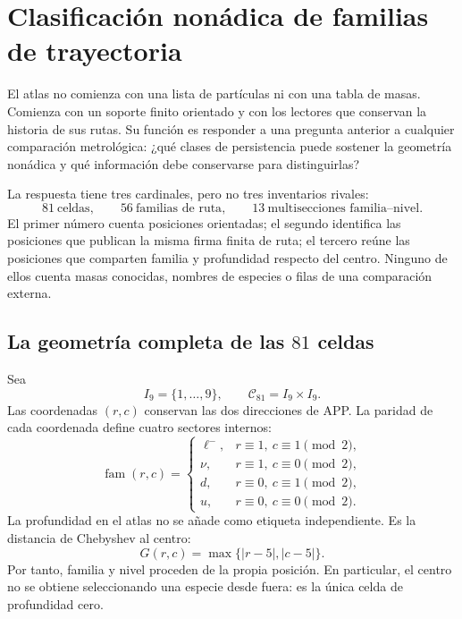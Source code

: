 \chapter[Clasificación nonádica de familias]{Clasificación nonádica de familias de trayectoria}
\label{chap:atlas-genealogia-masas}

El atlas no comienza con una lista de partículas ni con una tabla de masas.
Comienza con un soporte finito orientado y con los lectores que conservan la
historia de sus rutas.  Su función es responder a una pregunta anterior a
cualquier comparación metrológica: ¿qué clases de persistencia puede sostener
la geometría nonádica y qué información debe conservarse para distinguirlas?

La respuesta tiene tres cardinales, pero no tres inventarios rivales:
\[
 81\ \text{celdas},\qquad
 56\ \text{familias de ruta},\qquad
 13\ \text{multisecciones familia--nivel}.
\]
El primer número cuenta posiciones orientadas; el segundo identifica las
posiciones que publican la misma firma finita de ruta; el tercero reúne las
posiciones que comparten familia y profundidad respecto del centro.  Ninguno
de ellos cuenta masas conocidas, nombres de especies o filas de una
comparación externa.

\section{La geometría completa de las \(81\) celdas}

Sea
\[
 I_9=\{1,\ldots,9\},
 \qquad
 \mathcal C_{81}=I_9\times I_9.
\]
Las coordenadas \((r,c)\) conservan las dos direcciones de APP\@. La paridad
de cada coordenada define cuatro sectores internos:
\[
 \operatorname{fam}(r,c)=
 \begin{cases}
  \ell^- ,& r\equiv1,\ c\equiv1\pmod2,\\
  \nu ,& r\equiv1,\ c\equiv0\pmod2,\\
  d ,& r\equiv0,\ c\equiv1\pmod2,\\
  u ,& r\equiv0,\ c\equiv0\pmod2.
 \end{cases}
 \tag{A1}\label{eq:familias-paridad-atlas}
\]
La profundidad en el atlas no se añade como etiqueta independiente.  Es la
distancia de Chebyshev al centro:
\[
 G(r,c)=\max\{|r-5|,|c-5|\}.
 \tag{A2}\label{eq:generacion-chebyshev-atlas}
\]
Por tanto, familia y nivel proceden de la propia posición.  En particular,
el centro no se obtiene seleccionando una especie desde fuera: es la única
celda de profundidad cero.


